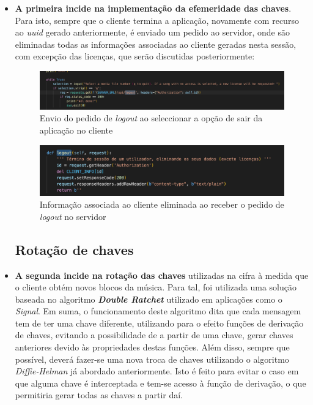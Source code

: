 \documentclass[10pt,english]{article}
\begin{document}
\begin{itemize}
    
\item  \textbf{A primeira incide na implementação da efemeridade das chaves}. Para isto, sempre que o cliente termina a aplicação, novamente com recurso ao \textit{uuid} gerado anteriormente, é enviado um pedido ao servidor, onde são eliminadas todas as informações associadas ao cliente geradas nesta sessão, com excepção das licenças, que serão discutidas posteriormente:

\begin{figure}[!h]
        \centering
        \includegraphics[width=\textwidth]{images/logout_client.png}
        \caption{Envio do pedido de \textit{logout} ao seleccionar a opção de sair da aplicação no cliente}
\end{figure}

\begin{figure}[!h]
        \centering
        \includegraphics[width=\textwidth]{images/logout_server.png}
        \caption{Informação associada ao cliente eliminada ao receber o pedido de \textit{logout} no servidor}
\end{figure}

\subsection{Rotação de chaves}

\item \textbf{A segunda incide na rotação das chaves} utilizadas na cifra à medida que o cliente obtém novos blocos da música. Para tal, foi utilizada uma solução baseada no algoritmo \textbf{\textit{Double Ratchet}} utilizado em aplicações como o \textit{Signal}. Em suma, o funcionamento deste algoritmo dita que cada mensagem tem de ter uma chave diferente, utilizando para o efeito funções de derivação de chaves, evitando a possibilidade de a partir de uma chave, gerar chaves anteriores devido às propriedades destas funções. Além disso, sempre que possível, deverá fazer-se uma nova troca de chaves utilizando o algoritmo \textit{Diffie-Helman} já abordado anteriormente. Isto é feito para evitar o caso em que alguma chave é interceptada e tem-se acesso à função de derivação, o que permitiria gerar todas as chaves a partir daí.


\end{itemize}
\end{document}
